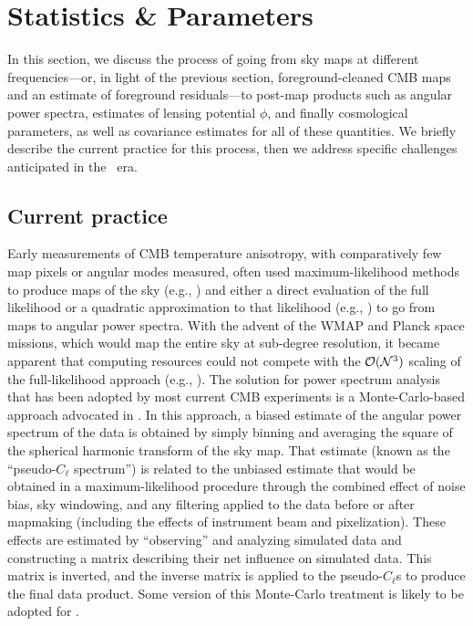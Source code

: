 \section{Statistics \& Parameters}

In this section, we discuss the process of going from sky maps at different frequencies---or, in light
of the previous section, foreground-cleaned CMB maps and an estimate of foreground residuals---to
post-map products such as angular power spectra, estimates of lensing potential $\phi$, and finally
cosmological parameters, as well as covariance estimates for all of these quantities. We briefly describe
the current practice for this process, then we address specific challenges anticipated in the \cmbexp\ era.

\subsection{Current practice}
\label{se:current}
Early measurements of CMB temperature anisotropy, with comparatively few map pixels or angular modes
measured, often used maximum-likelihood methods to produce maps of the sky (e.g., \cite{Wright:1996dk}) and
either a direct evaluation of the full likelihood or a quadratic approximation to that likelihood (e.g., \cite{Bond:1998zw}) to go from 
maps to angular power spectra. With the advent of the WMAP and Planck space 
missions, which would map the entire sky at sub-degree resolution, it became apparent that computing
resources could not compete with the $\mathcal{O}({\cal N}^3)$ scaling of the full-likelihood approach 
(e.g., \cite{Borrill:1998tn}). The solution for power spectrum analysis
that has been adopted by most current CMB experiments is a
Monte-Carlo-based approach advocated in \cite{Hivon:2001jp}. In this approach, a biased estimate of
the angular power spectrum of the data is obtained by simply binning and averaging the square 
of the spherical harmonic transform of the sky map. That estimate (known as the 
``pseudo-$C_\ell$ spectrum'') is related to the unbiased 
estimate that would be obtained in a maximum-likelihood procedure through the combined effect
of noise bias, sky windowing, and any filtering applied to the data before or after mapmaking
(including the effects of instrument beam and pixelization). These effects are estimated by ``observing''
and analyzing simulated data and constructing a matrix describing their net influence on simulated data. 
This matrix is inverted, and the inverse matrix is applied to the pseudo-$C_\ell$s to produce the 
final data product. Some version of this Monte-Carlo treatment is likely to be 
adopted for \cmbexp. 

